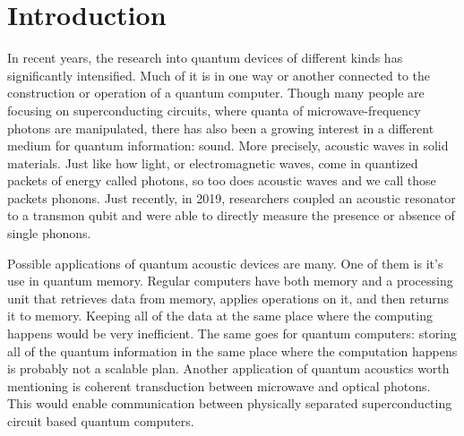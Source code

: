 \chapter{Introduction}


In recent years, the research into quantum devices of different kinds has
significantly intensified.
Much of it is in one way or another connected to the
construction or operation of a quantum computer.
Though many people are focusing on superconducting circuits, where quanta of
microwave-frequency photons are manipulated, there has also been
a growing interest in a different medium for quantum information: sound.
More precisely, acoustic waves in solid materials.
Just like how light, or electromagnetic waves, come in quantized packets of energy called
photons,
so too does acoustic waves and we call those packets phonons.
Just recently, in 2019, researchers coupled an acoustic resonator to a transmon
qubit and were able to directly measure the presence or absence of single
phonons.

Possible applications of quantum acoustic devices are many.
One of them is it's use in quantum memory.
Regular computers have both memory and a processing unit that
retrieves data from memory, applies operations on it, and then returns it to
memory.
Keeping all of the data at the same place where the computing happens would be
very inefficient.
The same goes for quantum computers: storing all of the quantum information in
the same place where the computation happens is probably not a scalable plan.
Another application of quantum acoustics worth mentioning is
coherent transduction between microwave and optical photons.
This would enable communication between physically separated superconducting
circuit based quantum computers.\cite{laer_controlling_2019}

